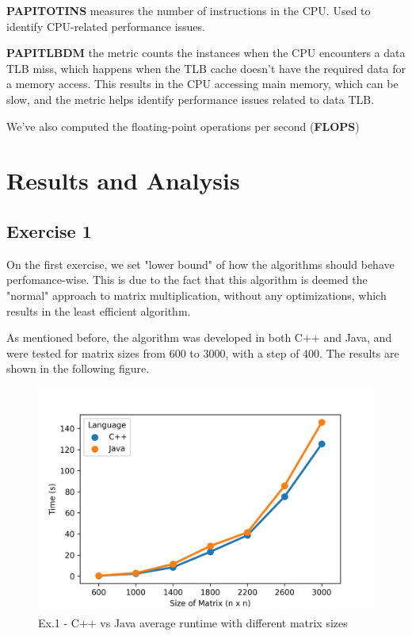 \documentclass[10pt, titlepage]{extarticle}
\begin{document}
\textbf{PAPI\textunderscore TOT\textunderscore INS} measures the number of instructions in the CPU. Used to identify CPU-related performance issues.

\textbf{PAPI\textunderscore TLB\textunderscore DM} the metric counts the instances when the CPU encounters a data TLB miss, which happens when the TLB cache doesn't have the required data for a memory access. This results in the CPU accessing main memory,
which can be slow, and the metric helps identify performance issues related to data TLB.


\vspace{20px}

We've also computed the floating-point operations per second (\textbf{FLOPS})


\section{Results and Analysis}\label{Results and Analysis}

\subsection{Exercise 1}\label{Exercise 1}

On the first exercise, we set "lower bound" of how the algorithms should behave perfomance-wise. This is due to the fact that this algorithm is deemed the "normal" approach to matrix multiplication, without any optimizations, which results in the least
efficient algorithm.

As mentioned before, the algorithm was developed in both C++ and Java, and were tested for matrix sizes from 600 to 3000,
with a step of 400. The results are shown in the following figure.

\begin{figure}[H]
    \centering
    \includegraphics[width=0.5\linewidth]{../plots/ex1/ex1-overall.png}
    \caption{Ex.1 - C++ vs Java average runtime with different matrix sizes}
\end{figure}
\end{document}
